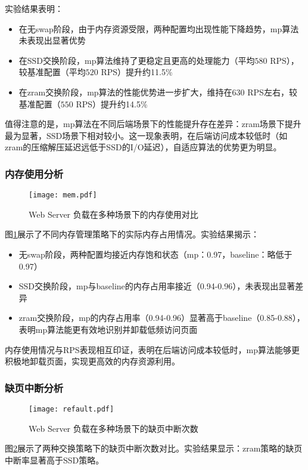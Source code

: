 实验结果表明：
\begin{itemize}
    \item 在无swap阶段，由于内存资源受限，两种配置均出现性能下降趋势，mp算法未表现出显著优势
    \item 在SSD交换阶段，mp算法维持了更稳定且更高的处理能力（平均$580$ RPS），较基准配置（平均$520$ RPS）提升约11.5\%
    \item 在zram交换阶段，mp算法的性能优势进一步扩大，维持在$630$ RPS左右，较基准配置（$550$ RPS）提升约14.5\%
\end{itemize}

值得注意的是，mp算法在不同后端场景下的性能提升存在差异：zram场景下提升最为显著，SSD场景下相对较小。这一现象表明，在后端访问成本较低时（如zram的压缩解压延迟远低于SSD的I/O延迟），自适应算法的优势更为明显。

\subsubsection{内存使用分析}
\begin{figure}[htbp]
    \centering
    \texttt{[image: mem.pdf]}
    \caption{Web Server 负载在多种场景下的内存使用对比}
    \label{fig:mem}
\end{figure}
图\ref{fig:mem}展示了不同内存管理策略下的实际内存占用情况。实验结果揭示：
\begin{itemize}
    \item 无swap阶段，两种配置均接近内存饱和状态（mp：0.97，baseline：略低于0.97）
    \item SSD交换阶段，mp与baseline的内存占用率接近（0.94-0.96），未表现出显著差异
    \item zram交换阶段，mp的内存占用率（0.94-0.96）显著高于baseline（0.85-0.88），表明mp算法能更有效地识别并卸载低频访问页面
\end{itemize}

内存使用情况与RPS表现相互印证，表明在后端访问成本较低时，mp算法能够更积极地卸载页面，实现更高效的内存资源利用。

\subsubsection{缺页中断分析}
\begin{figure}[htb]
    \centering
    \texttt{[image: refault.pdf]}
    \caption{Web Server 负载在多种场景下的缺页中断次数}
    \label{fig:refault}
\end{figure}
图\ref{fig:refault}展示了两种交换策略下的缺页中断次数对比。实验结果显示：zram策略的缺页中断率显著高于SSD策略。

